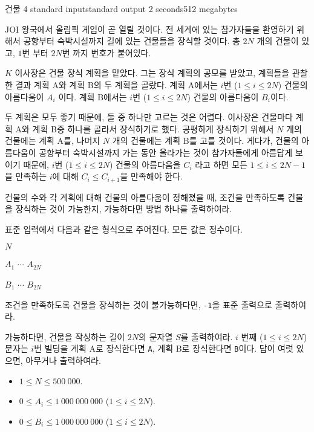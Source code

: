 \begin{problem}{건물 4}
	{standard input}{standard output}
	{2 seconds}{512 megabytes}{}
	
	JOI 왕국에서 올림픽 게임이 곧 열릴 것이다. 전 세계에 있는 참가자들을 환영하기 위해서 공항부터 숙박시설까지 길에 있는 건물들을 장식할 것이다. 총 $2N$ 개의 건물이 있고, $1$번 부터 $2N$번 까지 번호가 붙어있다.
	
	$K$ 이사장은 건물 장식 계획을 맡았다. 그는 장식 계획의 공모를 받았고, 계획들을 관찰한 결과 계획 A와 계획 B의 두 계획을 골랐다. 계획 A에서는 $i$번 ($1 \le i \le 2N$) 건물의 아름다움이 $A_i$ 이다. 계획 B에서는 $i$번 ($1 \le i \le 2N$) 건물의 아름다움이 $B_i$이다.
	
	두 계획은 모두 좋기 때문에, 둘 중 하나만 고르는 것은 어렵다. 이사장은 건물마다 계획 A와 계획 B중 하나를 골라서 장식하기로 했다. 공평하게 장식하기 위해서 $N$ 개의 건물에는 계획 A를, 나머지 $N$ 개의 건물에는 계획 B를 고를 것이다. 게다가, 건물의 아름다움이 공항부터 숙박시설까지 가는 동안 올라가는 것이 참가자들에게 아름답게 보이기 때문에, $i$번 ($1 \le i \le 2N$) 건물의 아름다움을 $C_i$ 라고 하면 모든 $1 \le i \le 2N-1$을 만족하는 $i$에 대해 $C_i \le C_{i+1}$을 만족해야 한다.
	
	건물의 수와 각 계획에 대해 건물의 아름다움이 정해졌을 때, 조건을 만족하도록 건물을 장식하는 것이 가능한지, 가능하다면 방법 하나를 출력하여라.
	
	\InputFile
	
	표준 입력에서 다음과 같은 형식으로 주어진다. 모든 값은 정수이다.

	$N$
	
	$A_1$ $\cdots$ $A_{2N}$
	
	$B_1$ $\cdots$ $B_{2N}$
	
	\OutputFile
	
	조건을 만족하도록 건물을 장식하는 것이 불가능하다면, \texttt{-1}을 표준 출력으로 출력하여라.
	
	가능하다면, 건물을 작싱하는 길이 $2N$의 문자열 $S$를 출력하여라. $i$ 번째 ($1 \le i \le 2N$) 문자는 $i$번 빌딩을 계획 A로 장식한다면 \texttt{A}, 계획 B로 장식한다면 \texttt{B}이다. 답이 여럿 있으면, 아무거나 출력하여라.
	
	\Constraints
	
	\begin{itemize}
	\item $1 \le N \le 500\ 000$.
	\item $0 \le A_i \le 1\ 000\ 000\ 000$ ($1 \le i \le 2N$).
	\item $0 \le B_i \le 1\ 000\ 000\ 000$ ($1 \le i \le 2N$).
	\end{itemize}
	

\end{problem}
